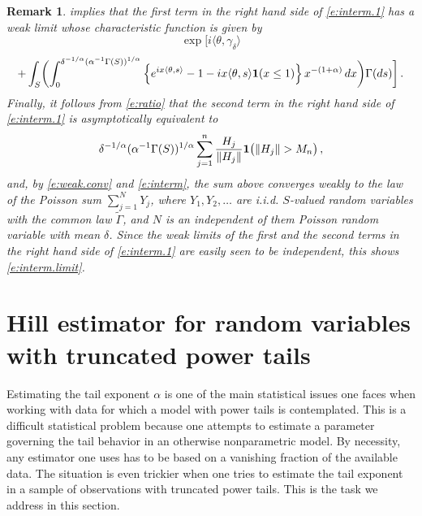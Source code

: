 \documentclass[11pt]{amsart}
\newtheorem{remark}{Remark}
\numberwithin{equation}{section}
\begin{document}
\begin{remark}
{implies that the first term in the right hand side of
\eqref{e:interm.1} has a weak limit whose characteristic function is
given by
$$
\exp\biggl[i\langle
\theta,\gamma_\delta\rangle
$$
$$
+
\int_{S}\biggl(
\int_0^{\delta^{-1/\alpha}(\alpha^{-1}\Gamma(S))^{1/\alpha}}
\left\{e^{ix\langle
      \theta,s\rangle}-1-ix\langle \theta,s\rangle {{\bf 1}}(x\le
    1)\right\}x^{-(1+\alpha)}\, dx \biggr)\Gamma(ds)\biggr]\,.
$$
Finally, it follows from \eqref{e:ratio} that the second term in
the right hand side of \eqref{e:interm.1} is asymptotically
equivalent to
$$
\delta^{-1/\alpha}(\alpha^{-1}\Gamma(S))^{1/\alpha}
\sum_{j=1}^n
\frac{H_j}{\|H_j\|}{{\bf 1}}\bigl(\|H_j\|>M_n\bigr)\,,
$$
and, by \eqref{e:weak.conv} and \eqref{e:interm},
 the sum above converges weakly to the law of the Poisson sum
$\sum_{j=1}^N Y_j$, where $Y_1,Y_2,\dots$ are i.i.d. $S$-valued random
variables with the common law $\tilde\Gamma$, and $N$ is an independent
of them Poisson random variable with mean $\delta$. Since the weak
limits of the first and the second terms in the right hand side of
\eqref{e:interm.1} are easily seen to be independent, this shows
\eqref{e:interm.limit}.
}
\end{remark}

\section{Hill estimator for random variables with truncated power tails} \label{sec:Hill}

Estimating the tail exponent $\alpha$ is one of the main
statistical issues one faces when working with data for which a
model with power tails is contemplated. This is a difficult
statistical problem because one attempts to estimate a parameter
governing the tail behavior in an otherwise nonparametric model.
By necessity, any estimator one uses has to be based on a
vanishing fraction of the available data. The situation is even
trickier when one tries to estimate the tail exponent in a sample
of observations with truncated power tails. This is the task we
address in this section.
\end{document}
